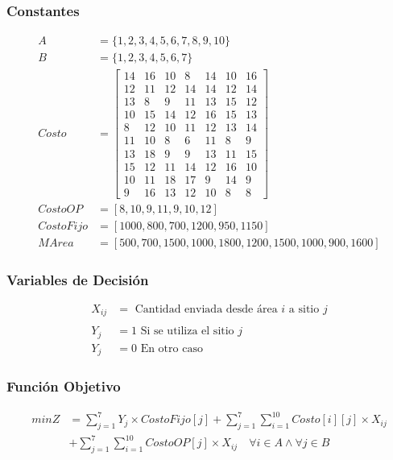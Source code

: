 \documentclass[a4paper,12pt]{article}
\begin{document}
\subsubsection{Constantes}
\begin{equation*}
\begin{split}
A&=\{1,2,3,4,5,6,7,8,9,10\}\\
B&=\{1,2,3,4,5,6,7\}\\
Costo &= \begin{bmatrix}
14 & 16 & 10 & 8 & 14 & 10 & 16\\
12 & 11 & 12 & 14 & 14 & 12 & 14\\
13 & 8 & 9 & 11 & 13 & 15 & 12\\
10 & 15 & 14 & 12 & 16 & 15 & 13\\
8 & 12 & 10 & 11 & 12 & 13 & 14\\
11 & 10 & 8 & 6 & 11 & 8 & 9\\
13 & 18 & 9 & 9 & 13 & 11 & 15\\
15 & 12 & 11 & 14 & 12 & 16 & 10\\
10 & 11 & 18 & 17 & 9 & 14 & 9\\
9 & 16 & 13 & 12 & 10 & 8 & 8
\end{bmatrix}\\
CostoOP&=[8,10,9,11,9,10,12]\\
CostoFijo&=[1000,800,700,1200,950,1150]\\
MArea&=[500,700,1500,1000,1800,1200,1500,1000,900,1600]
\end{split}
\end{equation*}
\subsubsection{Variables de Decisión}
\begin{equation*}
\begin{split}
	X_{ij}&=\text{ Cantidad enviada desde área } i \text{ a sitio } j\\
	\\
	Y_j&=1 \text{ Si se utiliza el sitio } j\\
	Y_j&=0 \text{ En otro caso}
\end{split}
\end{equation*}
\subsubsection{Función Objetivo}
\begin{equation*}
\begin{split}
	minZ &= \sum_{j=1}^{7}Y_j\times CostoFijo[j] + \sum_{j=1}^{7}\sum_{i=1}^{10}Costo[i][j]\times X_{ij}\\ 
	&+ \sum_{j=1}^{7}\sum_{i=1}^{10}CostoOP[j]\times X_{ij} \quad \forall i \in A \wedge \forall j \in B
\end{split}
\end{equation*}
\end{document}
